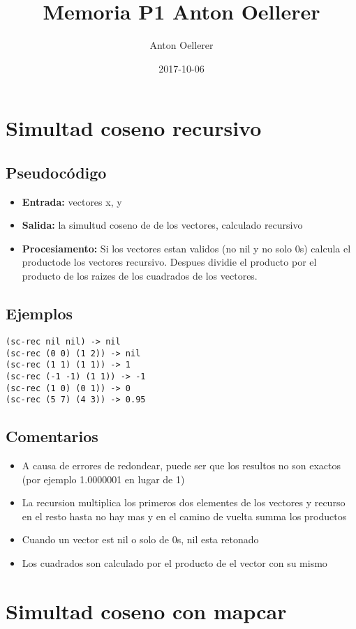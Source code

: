 \documentclass{article}
\title{Memoria P1 Anton Oellerer}
\date{2017-10-06}
\author{Anton Oellerer}
\begin{document}
\maketitle
\section{Simultad coseno recursivo}
\subsection{Pseudoc\'odigo}
\begin{itemize}
	\item \textbf{Entrada:} vectores x, y
	\item \textbf{Salida:} la simultud coseno de de los vectores, calculado recursivo
	\item \textbf{Procesiamento:} Si los vectores estan validos (no nil y no solo 0s) calcula el productode los vectores recursivo. Despues dividie el producto por el producto de los raizes de los cuadrados de los vectores.
\end{itemize}
\subsection{Ejemplos}
\begin{lstlisting}
(sc-rec nil nil) -> nil
(sc-rec (0 0) (1 2)) -> nil
(sc-rec (1 1) (1 1)) -> 1 
(sc-rec (-1 -1) (1 1)) -> -1 
(sc-rec (1 0) (0 1)) -> 0 
(sc-rec (5 7) (4 3)) -> 0.95 
\end{lstlisting}
\subsection{Comentarios}
\begin{itemize}
	\item A causa de errores de redondear, puede ser que los resultos no son exactos (por ejemplo 1.0000001 en lugar de 1)
	\item La recursion multiplica los primeros dos elementes de los vectores y recurso en el resto hasta no hay mas y en el camino de vuelta summa los productos
	\item Cuando un vector est nil o solo de 0s, nil esta retonado
	\item Los cuadrados son calculado por el producto de el vector con su mismo
\end{itemize}
\section{Simultad coseno con mapcar}
\end{document}
